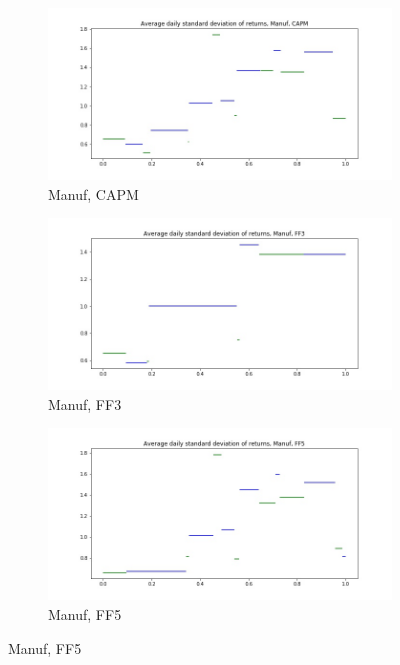 \documentclass{article}
\begin{document}
 
  \begin{figure}
  \centering
  \begin{subfigure}[b]{0.3\textwidth}
    \centering
    \includegraphics[width=\textwidth]{Manuf/daily_stdevCAPM.jpg}
    \caption{Manuf, CAPM}
    \label{fig:1}
  \end{subfigure}
  \begin{subfigure}[b]{0.3\textwidth}
    \centering
    \includegraphics[width=\textwidth]{Manuf/daily_stdevFF3.jpg}
    \caption{Manuf, FF3}
    \label{fig:2}
  \end{subfigure}
    \begin{subfigure}[b]{0.3\textwidth}
    \centering
    \includegraphics[width=\textwidth]{Manuf/daily_stdevFF5.jpg}
    \caption{Manuf, FF5}
    \label{fig:1}
  \end{subfigure}
  \end{figure}
  
\end{document}
